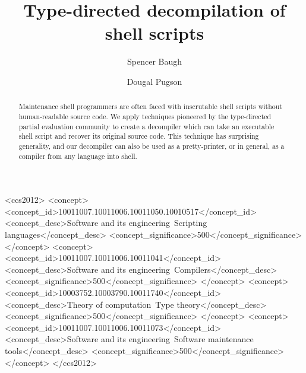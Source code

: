 \documentclass[sigplan]{acmart}
\begin{document}
\title[Type-directed decompilation of shell scripts]{Type-directed decompilation of shell scripts}

\author{Spencer Baugh}
\author{Dougal Pugson}

\begin{abstract}
Maintenance shell programmers are often faced with inscrutable shell scripts without human-readable source code.
We apply techniques pioneered by the type-directed partial evaluation community
to create a decompiler which can take an executable shell script and recover its original source code. 
This technique has surprising generality,
and our decompiler can also be used as a pretty-printer, or in general,
as a compiler from any language into shell.
\end{abstract}

%
%
\begin{CCSXML}
<ccs2012>
   <concept>
       <concept_id>10011007.10011006.10011050.10010517</concept_id>
       <concept_desc>Software and its engineering~Scripting languages</concept_desc>
       <concept_significance>500</concept_significance>
       </concept>
   <concept>
       <concept_id>10011007.10011006.10011041</concept_id>
       <concept_desc>Software and its engineering~Compilers</concept_desc>
       <concept_significance>500</concept_significance>
       </concept>
   <concept>
       <concept_id>10003752.10003790.10011740</concept_id>
       <concept_desc>Theory of computation~Type theory</concept_desc>
       <concept_significance>500</concept_significance>
       </concept>
   <concept>
       <concept_id>10011007.10011006.10011073</concept_id>
       <concept_desc>Software and its engineering~Software maintenance tools</concept_desc>
       <concept_significance>500</concept_significance>
       </concept>
 </ccs2012>
\end{CCSXML}

\end{document}
